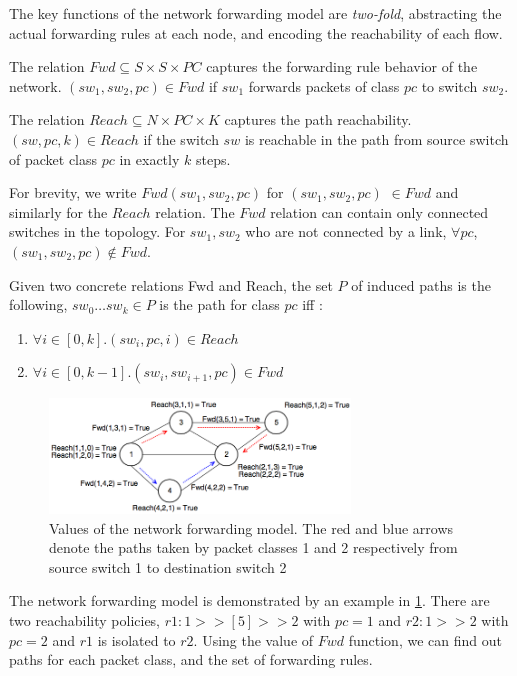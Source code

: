 The key functions of the network forwarding model are \emph{two-fold}, abstracting the actual forwarding rules at each node, and encoding the reachability of each flow. 
\begin{mydef}
\label{def:fwd}
The relation $Fwd \subseteq S \times S \times PC $ captures the forwarding rule behavior of the network. 
$(sw_1, sw_2, pc)\in Fwd$ if 
$sw_1$ forwards packets of class $pc$ to switch $sw_2$. 
\end{mydef}
\begin{mydef}
\label{def:reach}
	The relation $Reach \subseteq N \times PC \times K$ captures the path reachability.   
	$(sw, pc, k)\in Reach$ if 
	the switch $sw$ is reachable in the path from source switch of packet class $pc$ in exactly $k$ steps.  
\end{mydef}
For brevity, we write $Fwd(sw_1, sw_2, pc)$ for $(sw_1, sw_2, pc) $ $\in Fwd$ and similarly for the $Reach$ relation. The $Fwd$ relation can contain only connected switches in the topology. For $sw_1, sw_2$ who are not connected by a link, $\forall pc$, $(sw_1,sw_2,pc) \notin Fwd$. 

Given two concrete relations Fwd and Reach, the set $P$ of induced paths is the following, 
$sw_0 \ldots sw_k \in P$ is the path for class $pc$ iff : 
\begin{enumerate}
	\item $\forall i \in [0,k]. (sw_i, pc, i) \in Reach$
	\item $\forall i \in [0, k - 1]. (sw_i, sw_{i+1}, pc) \in Fwd$
\end{enumerate}

\begin{figure}[H]
	\includegraphics[width=8cm]{topoF.png}
	\caption{Values of the network forwarding model. The red and blue arrows denote the paths taken by packet classes 1 and 2 respectively from source switch 1 to destination switch 2}
	\label{fig:model}
\end{figure}
The network forwarding model is demonstrated by an example in \cref{fig:model}. There are two reachability policies, $r1 : 1 >> [5] >> 2$ with $pc=1$ and $r2 : 1 >> 2$ with $pc=2$ and $r1$ is isolated to $r2$. Using the value of $Fwd$ function, we can find out paths for each packet class, and the set of forwarding rules. 

